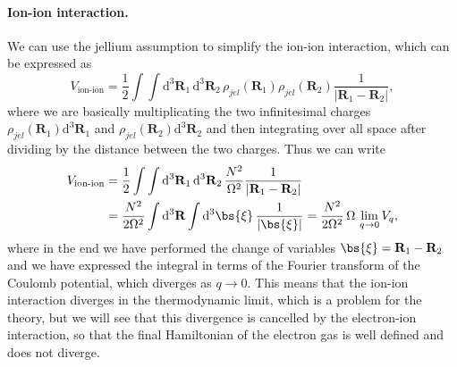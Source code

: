 \paragraph{Ion-ion interaction.}
We can use the jellium assumption to simplify the ion-ion interaction, which can be expressed as
\[
    V_{\text{ion-ion}} = \frac{1}{2} \int \int \mathrm{d}^3 \mathbf{R}_1 \, \mathrm{d}^3 \mathbf{R}_2 \, \rho_{jel}(\mathbf{R}_1) \rho_{jel}(\mathbf{R}_2) \frac{1}{|\mathbf{R}_1 - \mathbf{R}_2|},
\]
where we are basically multiplicating the two infinitesimal charges \(\rho_{jel}(\mathbf{R}_1) \mathrm{d}^3 \mathbf{R}_1\) and \(\rho_{jel}(\mathbf{R}_2) \mathrm{d}^3 \mathbf{R}_2\) and then integrating over all space after dividing by the distance between the two charges. Thus we can write
\[
    \begin{aligned}
        V_{\text{ion-ion}} & = \frac{1}{2} \int \int \mathrm{d}^3 \mathbf{R}_1 \, \mathrm{d}^3 \mathbf{R}_2 \, \frac{N^2}{\Omega^2} \frac{1}{|\mathbf{R}_1 - \mathbf{R}_2|}                    \\
                           & = \frac{N^2}{2 \Omega^2} \int \mathrm{d}^3 \mathbf{R} \int \mathrm{d}^3 \bs{\xi} \, \frac{1}{|\bs{\xi}|} = \frac{N^2}{2 \Omega^2} \,\Omega \, \lim_{q \to 0} V_q,
    \end{aligned}
\]
where in the end we have performed the change of variables \(\bs{\xi} = \mathbf{R}_1 - \mathbf{R}_2\) and we have expressed the integral in terms of the Fourier transform of the Coulomb potential, which diverges as \(q \to 0\). This means that the ion-ion interaction diverges in the thermodynamic limit, which is a problem for the theory, but we will see that this divergence is cancelled by the electron-ion interaction, so that the final Hamiltonian of the electron gas is well defined and does not diverge.

